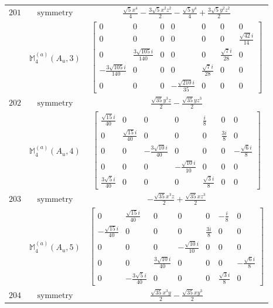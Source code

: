 \documentclass[fleqn,8pt,landscape]{jsarticle}
\begin{document}
\begin{longtable}{ccc}
$ 201 $ & $ \text{symmetry} $ & $ \frac{\sqrt{5} x^{4}}{4} - \frac{3 \sqrt{5} x^{2} z^{2}}{2} - \frac{\sqrt{5} y^{4}}{4} + \frac{3 \sqrt{5} y^{2} z^{2}}{2} $ \\
$  $ & $ \mathbb{M}_{4}^{(a)}(A_{u},3) $ & $ \begin{bmatrix} 0 & 0 & 0 & 0 & 0 & 0 & 0 \\ 0 & 0 & 0 & 0 & 0 & 0 & \frac{\sqrt{42} i}{14} \\ 0 & \frac{3 \sqrt{105} i}{140} & 0 & 0 & 0 & \frac{\sqrt{7} i}{28} & 0 \\ - \frac{3 \sqrt{105} i}{140} & 0 & 0 & 0 & \frac{\sqrt{7} i}{28} & 0 & 0 \\ 0 & 0 & 0 & - \frac{\sqrt{210} i}{35} & 0 & 0 & 0 \end{bmatrix} $ \\ \hline
$ 202 $ & $ \text{symmetry} $ & $ \frac{\sqrt{35} y^{3} z}{2} - \frac{\sqrt{35} y z^{3}}{2} $ \\
$  $ & $ \mathbb{M}_{4}^{(a)}(A_{u},4) $ & $ \begin{bmatrix} \frac{\sqrt{15} i}{40} & 0 & 0 & 0 & \frac{i}{8} & 0 & 0 \\ 0 & \frac{\sqrt{15} i}{40} & 0 & 0 & 0 & \frac{3 i}{8} & 0 \\ 0 & 0 & - \frac{3 \sqrt{10} i}{40} & 0 & 0 & 0 & - \frac{\sqrt{6} i}{8} \\ 0 & 0 & 0 & - \frac{\sqrt{10} i}{10} & 0 & 0 & 0 \\ \frac{3 \sqrt{5} i}{40} & 0 & 0 & 0 & \frac{\sqrt{3} i}{8} & 0 & 0 \end{bmatrix} $ \\ \hline
$ 203 $ & $ \text{symmetry} $ & $ - \frac{\sqrt{35} x^{3} z}{2} + \frac{\sqrt{35} x z^{3}}{2} $ \\
$  $ & $ \mathbb{M}_{4}^{(a)}(A_{u},5) $ & $ \begin{bmatrix} 0 & \frac{\sqrt{15} i}{40} & 0 & 0 & 0 & - \frac{i}{8} & 0 \\ - \frac{\sqrt{15} i}{40} & 0 & 0 & 0 & \frac{3 i}{8} & 0 & 0 \\ 0 & 0 & 0 & - \frac{\sqrt{10} i}{10} & 0 & 0 & 0 \\ 0 & 0 & \frac{3 \sqrt{10} i}{40} & 0 & 0 & 0 & - \frac{\sqrt{6} i}{8} \\ 0 & - \frac{3 \sqrt{5} i}{40} & 0 & 0 & 0 & \frac{\sqrt{3} i}{8} & 0 \end{bmatrix} $ \\ \hline
$ 204 $ & $ \text{symmetry} $ & $ \frac{\sqrt{35} x^{3} y}{2} - \frac{\sqrt{35} x y^{3}}{2} $ \\

\end{longtable}
\end{document}
